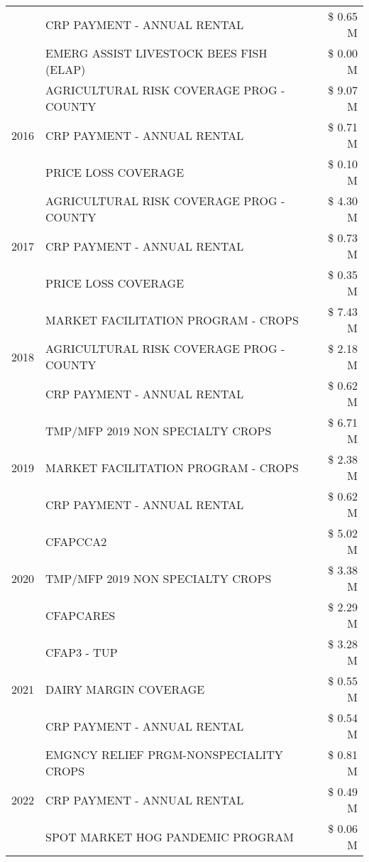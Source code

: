 \begin{tabular}{llr}
 & CRP PAYMENT - ANNUAL RENTAL & \$ 0.65 M \\
 & EMERG ASSIST LIVESTOCK BEES FISH (ELAP) & \$ 0.00 M \\
\cline{1-3}
\multirow[t]{3}{*}{2016} & AGRICULTURAL RISK COVERAGE PROG - COUNTY & \$ 9.07 M \\
 & CRP PAYMENT - ANNUAL RENTAL & \$ 0.71 M \\
 & PRICE LOSS COVERAGE & \$ 0.10 M \\
\cline{1-3}
\multirow[t]{3}{*}{2017} & AGRICULTURAL RISK COVERAGE PROG - COUNTY & \$ 4.30 M \\
 & CRP PAYMENT - ANNUAL RENTAL & \$ 0.73 M \\
 & PRICE LOSS COVERAGE & \$ 0.35 M \\
\cline{1-3}
\multirow[t]{3}{*}{2018} & MARKET FACILITATION PROGRAM - CROPS & \$ 7.43 M \\
 & AGRICULTURAL RISK COVERAGE PROG - COUNTY & \$ 2.18 M \\
 & CRP PAYMENT - ANNUAL RENTAL & \$ 0.62 M \\
\cline{1-3}
\multirow[t]{3}{*}{2019} & TMP/MFP 2019 NON SPECIALTY CROPS & \$ 6.71 M \\
 & MARKET FACILITATION PROGRAM - CROPS & \$ 2.38 M \\
 & CRP PAYMENT - ANNUAL RENTAL & \$ 0.62 M \\
\cline{1-3}
\multirow[t]{3}{*}{2020} & CFAPCCA2 & \$ 5.02 M \\
 & TMP/MFP 2019 NON SPECIALTY CROPS & \$ 3.38 M \\
 & CFAPCARES & \$ 2.29 M \\
\cline{1-3}
\multirow[t]{3}{*}{2021} & CFAP3 - TUP & \$ 3.28 M \\
 & DAIRY MARGIN COVERAGE & \$ 0.55 M \\
 & CRP PAYMENT - ANNUAL RENTAL & \$ 0.54 M \\
\cline{1-3}
\multirow[t]{3}{*}{2022} & EMGNCY RELIEF PRGM-NONSPECIALITY CROPS & \$ 0.81 M \\
 & CRP PAYMENT - ANNUAL RENTAL & \$ 0.49 M \\
 & SPOT MARKET HOG PANDEMIC PROGRAM & \$ 0.06 M \\
\cline{1-3}
\bottomrule
\end{tabular}
